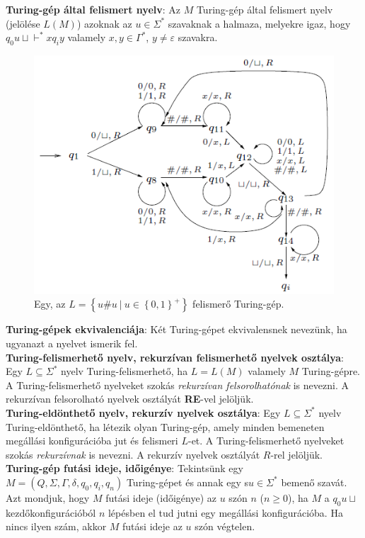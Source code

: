 \documentclass[tikz,12pt,margin=0px]{article}
\begin{document}
    \noindent \textbf{Turing-gép által felismert nyelv}: Az $M$ Turing-gép által felismert nyelv (jelölése $L(M)$) azoknak az $u \in \Sigma^{*}$ szavaknak a halmaza, melyekre igaz, hogy $q_{0}u\sqcup \vdash^{*} xq_{i}y$ valamely $x,y \in \Gamma^{*}$, $y \not = \varepsilon$ szavakra.
	
	\begin{figure}[H]
		\centering
		\includegraphics[width=0.6\linewidth]{img/turinggep_pelda}
		\caption{Egy, az $L = \left\{u\#u \ | \ u \in \left\{0,1\right\}^{+}\right\}$ felismerő Turing-gép.}
		\label{fig:turinggep_pelda}
	\end{figure}
	
	\noindent \textbf{Turing-gépek ekvivalenciája}: Két Turing-gépet ekvivalensnek nevezünk, ha ugyanazt a nyelvet ismerik fel.\\

	\noindent \textbf{Turing-felismerhető nyelv, rekurzívan felismerhető nyelvek osztálya}:
    Egy $L \subseteq \Sigma^{*}$ nyelv Turing-felismerhető, ha	$L = L(M)$ valamely $M$ Turing-gépre. A Turing-felismerhető nyelveket szokás \textit{rekurzívan felsorolhatónak} is nevezni. A rekurzívan felsorolható nyelvek osztályát \textbf{RE}-vel jelöljük.\\
	
	\noindent \textbf{Turing-eldönthető nyelv, rekurzív nyelvek osztálya}:
    Egy $L \subseteq \Sigma^{*}$ nyelv Turing-eldönthető, ha létezik olyan Turing-gép, amely minden bemeneten megállási konfigurációba jut és felismeri $L$-et. A Turing-felismerhető nyelveket szokás \textit{rekurzívnak} is nevezni. A rekurzív nyelvek osztályát $R$-rel jelöljük.\\
	
	\noindent \textbf{Turing-gép futási ideje, időigénye}:
    Tekintsünk egy $M = (Q, \Sigma, \Gamma, \delta, q_{0}, q_{i}, q_{n})$ Turing-gépet és annak egy s$u \in \Sigma^{*}$ bemenő szavát. Azt mondjuk, hogy $M$ futási ideje (időigénye) az $u$ szón $n$ ($n \geq 0$), ha $M$ a $q_{0}u\sqcup$ kezdőkonfigurációból $n$ lépésben el tud jutni egy megállási konfigurációba. Ha nincs ilyen szám, akkor $M$ futási ideje az $u$ szón végtelen.\\
	
\end{document}
